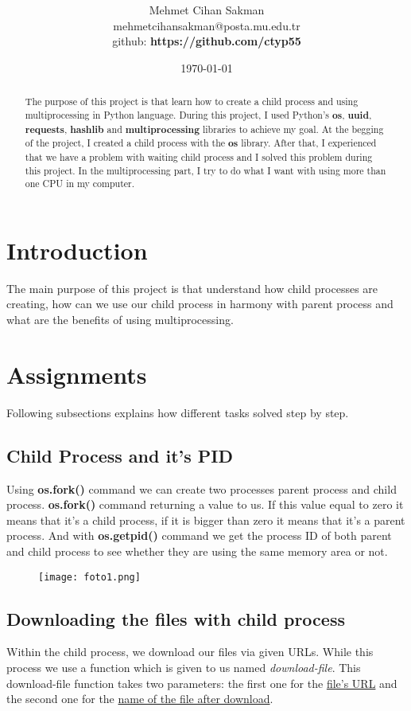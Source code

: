 \documentclass[onecolumn]{article}
\title{\spacecaps{Assignment Report 2: Child Process and Multiprocessing}\\ \normalsize \spacesc{CENG2034, Operating Systems} }
\author{Mehmet Cihan Sakman\\mehmetcihansakman@posta.mu.edu.tr\\github: \textbf{https://github.com/ctyp55}}
\date{\today}
\begin{document}
\maketitle
\begin{abstract}
The purpose of this project is that learn how to create a child process and using multiprocessing in Python language. During this project, I used Python's \textbf{os}, \textbf{uuid}, \textbf{requests}, \textbf{hashlib} and \textbf{multiprocessing} libraries to achieve my goal. At the begging of the project, I created a child process with the \textbf{os} library. After that, I experienced that we have a problem with waiting child process and I solved this problem during this project. In the multiprocessing part, I try to do what I want with using more than one CPU in my computer.
\end{abstract}

\section{Introduction}
The main purpose of this project is that understand how child processes are creating, how can we use our child process in harmony with parent process and what are the benefits of using multiprocessing. 

\section{Assignments}
Following subsections explains how different tasks solved step by step.

\subsection{Child Process and it's PID}

Using \textbf{os.fork()} command we can create two processes parent process and child process. \textbf{os.fork()} command returning a value to us. If this value equal to zero it means that it's a child process, if it is bigger than zero it means that it's a parent process. And with \textbf{os.getpid()} command we get the process ID of both parent and child process to see whether they are using the same memory area or not.

\begin{figure}[h]
\texttt{[image: foto1.png]}
\centering
\end{figure}

\subsection{Downloading the files with child process}
Within the child process, we download our files via given URLs. While this process we use a function which is given to us named \emph{download-file}. This download-file function takes two parameters: the first one for the \underline{file's URL} and the second one for the \underline{name of the file after download}.\newline
\end{document}

